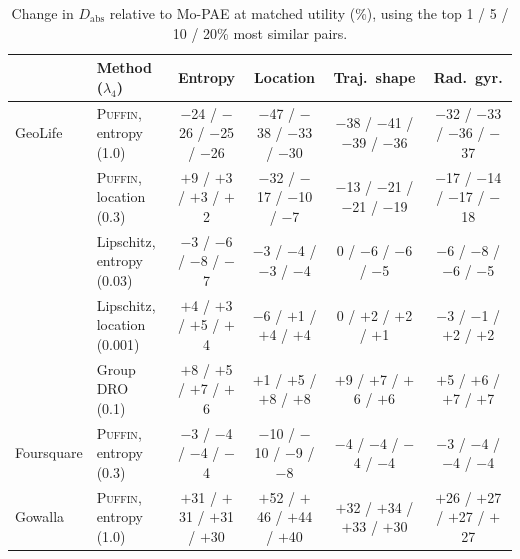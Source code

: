 \documentclass[sigconf,anonymous,review]{acmart}
\newcommand{\puffin}{\textsc{Puffin}}
\begin{document}
\begin{table}[!htbp]
\centering
\caption{Change in $D_{\mathrm{abs}}$ relative to Mo-PAE at matched utility (\%), using the top 1 / 5 / 10 / 20\% most similar pairs.}
\label{tab:topk}
\small
\begin{tabular}{@{}llcccc@{}}
\toprule
 & Method ($\lambda_4$) & Entropy & Location & Traj.\ shape & Rad.\ gyr. \\
\midrule
GeoLife & \puffin, entropy (1.0) & $-$24 / $-$26 / $-$25 / $-$26 & $-$47 / $-$38 / $-$33 / $-$30 & $-$38 / $-$41 / $-$39 / $-$36 & $-$32 / $-$33 / $-$36 / $-$37 \\
 & \puffin, location (0.3) & $+$9 / $+$3 / $+$3 / $+$2 & $-$32 / $-$17 / $-$10 / $-$7 & $-$13 / $-$21 / $-$21 / $-$19 & $-$17 / $-$14 / $-$17 / $-$18 \\
 & Lipschitz, entropy (0.03) & $-$3 / $-$6 / $-$8 / $-$7 & $-$3 / $-$4 / $-$3 / $-$4 & 0 / $-$6 / $-$6 / $-$5 & $-$6 / $-$8 / $-$6 / $-$5 \\
 & Lipschitz, location (0.001) & $+$4 / $+$3 / $+$5 / $+$4 & $-$6 / $+$1 / $+$4 / $+$4 & 0 / $+$2 / $+$2 / $+$1 & $-$3 / $-$1 / $+$2 / $+$2 \\
 & Group DRO (0.1) & $+$8 / $+$5 / $+$7 / $+$6 & $+$1 / $+$5 / $+$8 / $+$8 & $+$9 / $+$7 / $+$6 / $+$6 & $+$5 / $+$6 / $+$7 / $+$7 \\
Foursquare & \puffin, entropy (0.3) & $-$3 / $-$4 / $-$4 / $-$4 & $-$10 / $-$10 / $-$9 / $-$8 & $-$4 / $-$4 / $-$4 / $-$4 & $-$3 / $-$4 / $-$4 / $-$4 \\
Gowalla & \puffin, entropy (1.0) & $+$31 / $+$31 / $+$31 / $+$30 & $+$52 / $+$46 / $+$44 / $+$40 & $+$32 / $+$34 / $+$33 / $+$30 & $+$26 / $+$27 / $+$27 / $+$27 \\
\bottomrule
\end{tabular}
\end{table}
\end{document}
